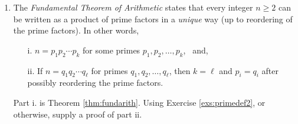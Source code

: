 \begin{exercises}{}{}
\begin{enumerate}
	    
	  \item The \emph{Fundamental Theorem of Arithmetic} states that every integer $n\ge 2$ can be written as a product of prime factors in a \emph{unique} way (up to reordering of the prime factors). In other words, 
		\begin{itemize}
	    \item[i.] $n=p_1p_2\cdots p_k$ for some primes $p_1,p_2,\ldots,p_k$, \ and,
	    \item[ii.] If $n=q_1q_2\cdots q_\ell$ for primes $q_1,q_2,\ldots,q_\ell$, then $k=\ell$ and $p_i=q_i$ after possibly reordering the prime factors. 
		\end{itemize}
	  Part i.{} is Theorem \ref{thm:fundarith}. Using Exercise \ref{exs:primedef2}, or otherwise, supply a proof of part ii.
		
	\end{enumerate}
\end{exercises}



\clearpage
